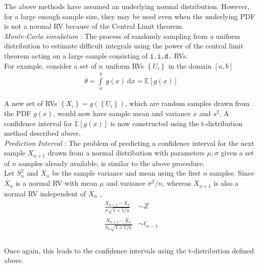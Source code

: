 The above methods have assumed an underlying normal distribution. However, for a large enough sample size, they may be used even when the underlying PDF is not a normal RV because of the Central Limit theorem. \\


\textit{Monte-Carlo simulation} : The process of randomly sampling from a uniform distribution to estimate difficult integrals using the power of the central limit theorem acting on a large sample consisting of \texttt{i.i.d.} RVs. \\

For example, consider a set of $ n $ uniform RVs $ \left\{U_i\right\} $ in the domain $ [a,b] $ \\

\begin{align}
	\theta = \int\limits_{a}^{b}\ g(x)\ \mathrm{d}x = \mathbb{E}[g(x)]
\end{align}

A new set of RVs $ \left\{X_i\right\}  = g(\left\{U_i\right\})$, which are random samples drawn from the PDF $ g(x) $, would now have sample mean and variance $ \overline{x} $ and $ s^2 $. A confidence interval for $ \mathbb{E}[g(x)] $ is now constructed using the t-distribution method described above.\\ 

\textit{Prediction Interval} : The problem of predicting a confidence interval for the next sample $ X_{n+1} $ drawn from a normal distribution with parameters $ \mu, \sigma $ given a set of $ n $ samples already available, is similar to the above procedure. \\

Let $ S_n^2 $ and $ \overline{X}_n $ be the sample variance and mean using the first $ n $ samples. Since $ \overline{X}_n $ is a normal RV with mean $ \mu $ and variance $ \sigma^2 / n $, whereas $ X_{n+1} $ is also a normal RV independent of $ \overline{X}_n $ , \\


\begin{align}
	\frac{X_{n+1} - \overline{X}_n}{\sigma \sqrt{1 + 1/n}} &\sim Z \nonumber \\
	\frac{X_{n+1} - \overline{X}_n}{S_n \sqrt{1 + 1/n}} &\sim t_{n-1} \nonumber \\
\end{align} \\

Once again, this leads to the confidence intervals using the t-distribution defined above.\\

